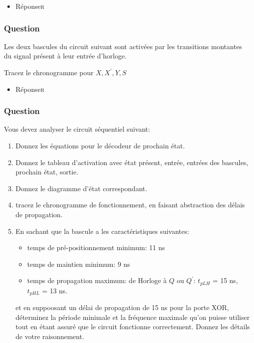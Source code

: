 \documentclass[11pt]{article}
\begin{document}
\begin{itemize}
\item Réponse\hfill{}\textsc{r}
\label{sec:org8b753f9}
\end{itemize}

\subsubsection*{Question}
\label{sec:org23b0df8}
Les deux bascules du circuit suivant sont activées par les
   transitions montantes du signal présent à leur entrée
   d'horloge. 
   \begin{center}

\end{center}

Tracez le chronogramme pour \(X, X^\prime, Y, S\)

\begin{itemize}
\item Réponse\hfill{}\textsc{r}
\label{sec:org6a1be2a}
\end{itemize}

\subsubsection*{Question}
\label{sec:org3f00e23}
Vous devez analyser le circuit séquentiel suivant:
\begin{center}

\end{center}

\begin{enumerate}
\item Donnez les équations pour le décodeur de prochain état.

\item Donnez le tableau d'activation avec état présent, entrée, entrées
des bascules, prochain état, sortie.

\item Donnez le diagramme d'état correspondant.

\item tracez le chronogramme de fonctionnement, en
faisant abstraction des délais de propagation.

\item En sachant que la bascule a les caractéristiques suivantes:

\begin{itemize}
\item temps de pré-positionnement minimum: 11 ns

\item temps de maintien minimum: 9 ns

\item temps de propagation maximum: de Horloge à \(Q\) ou
\(Q^{\prime}\): \(t_{pLH}\) = 15 ns, \(t_{pHL}\) = 13 ns.
\end{itemize}

et en suppoosant un délai de propagation de 15 ns pour la porte
XOR, déterminez la période minimale et la fréquence
maximale qu'on puisse utiliser tout en étant assuré que le circuit
fonctionne correctement. Donnez les détails de votre raisonnement.
\end{enumerate}
\end{document}

